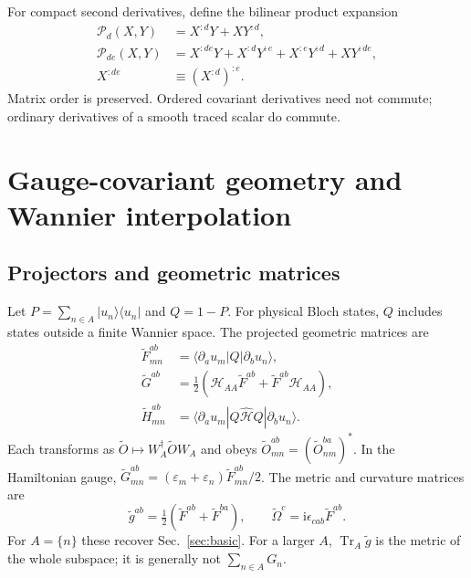 \documentclass[prx,amsmath,amssymb,superscriptaddress,longbibliography]{revtex4-2}
\newcommand{\Tr}{\operatorname{Tr}}
\newcommand{\ii}{\mathrm{i}}
\begin{document}
For compact second derivatives, define the bilinear product expansion
\begin{align}
 \mathscr P_d(X,Y)&=X^{:d}Y+XY^{:d},\nonumber\\
 \mathscr P_{de}(X,Y)&=X^{:de}Y+X^{:d}Y^{:e}
                 +X^{:e}Y^{:d}+XY^{:de},
 \label{eq:second-product}\\
 X^{:de}&\equiv(X^{:d})^{:e}.
 \nonumber
\end{align}
Matrix order is preserved. Ordered covariant derivatives need not commute;
ordinary derivatives of a smooth traced scalar do commute.

\section{Gauge-covariant geometry and Wannier interpolation}
\label{sec:interpolation}

\subsection{Projectors and geometric matrices}
Let $P=\sum_{n\in A}|u_n\rangle\langle u_n|$ and $Q=1-P$.
For physical Bloch states, $Q$ includes states outside a finite Wannier space.
The projected geometric matrices are
\begin{align}
 \widetilde F_{mn}^{ab}
 &=\langle\partial_a u_m|Q|\partial_b u_n\rangle,
 \label{eq:Fprojected}\\
 \widetilde G^{ab}&=\tfrac12(\mathcal H_{AA}\widetilde F^{ab}
                            +\widetilde F^{ab}\mathcal H_{AA}),
 \label{eq:Gweighted}\\
 \widetilde H_{mn}^{ab}
 &=\langle\partial_a u_m|Q\hat{\mathcal H}Q|\partial_b u_n\rangle.
 \label{eq:Hprojected}
\end{align}
Each transforms as $\widetilde O\mapsto W_A^\dagger\widetilde O W_A$ and obeys
$\widetilde O_{mn}^{ab}=(\widetilde O_{nm}^{ba})^*$.
In the Hamiltonian gauge,
$\widetilde G_{mn}^{ab}=(\varepsilon_m+\varepsilon_n)\widetilde F_{mn}^{ab}/2$.
The metric and curvature matrices are
\begin{equation}
 \widetilde g^{ab}=\tfrac12(\widetilde F^{ab}+\widetilde F^{ba}),\qquad
 \widetilde\Omega^c=\ii\epsilon_{cab}\widetilde F^{ab}.
 \label{eq:projected-geometry}
\end{equation}
For $A=\{n\}$ these recover Sec.~\ref{sec:basic}.
For a larger $A$, $\Tr_A\widetilde g$ is the metric of the whole subspace;
it is generally not $\sum_{n\in A}G_n$.
\end{document}
